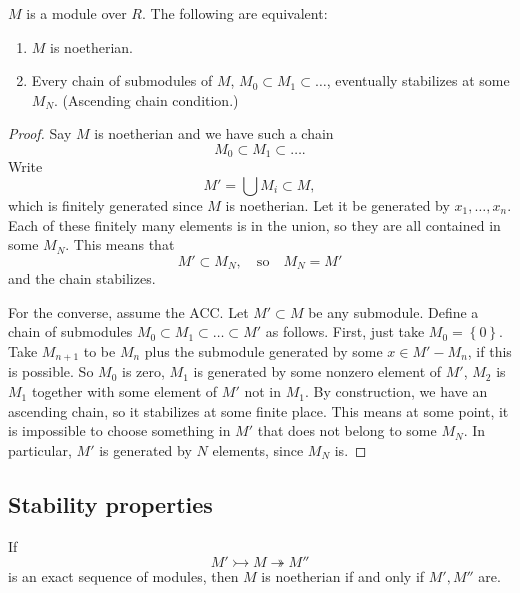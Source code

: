 \begin{proposition} $M$ is a module over $R$.
The following are equivalent:
\begin{enumerate}
\item $M$ is noetherian. 
\item Every chain of submodules of $M$, $M_0 \subset M_1 \subset \dots$,
eventually stabilizes at some $M_N$. (Ascending chain condition.)
\end{enumerate}
\end{proposition} 
\begin{proof} 
Say $M$ is noetherian and we have such a chain
\[ M_0 \subset M_1 \subset \dots.  \]
Write
\[ M' = \bigcup M_i \subset M,  \]
which is finitely generated since $M$ is noetherian. Let it be generated by
$x_1, \dots,x_n$. Each of these finitely many elements is in the union, so
they are all contained in some $M_N$. This means that
\[ M' \subset M_N, \quad \mathrm{so} \quad M_N = M'  \]
and the chain stabilizes.

For the converse, assume the ACC.  Let $M' \subset M$ be any submodule.  Define
a chain of submodules $M_0 \subset M_1 \subset  \dots \subset M'$ as follows. First, just take
$M_0 = \left\{0\right\}$. Take $M_{n+1}$ to be $M_n$ plus the submodule
generated by some $x \in M' - M_n$, if this is possible.  So $M_0$ is zero,
$M_1$ is generated by some nonzero element of $M'$, $M_2$ is $M_1$ together
with some element of $M'$ not in $M_1$. By construction, we have an ascending
chain, so it stabilizes at some finite place.  This means at some point, it is
impossible to choose something in $M'$ that does not belong to some $M_N$. In
particular, $M'$ is generated by $N$ elements, since $M_N$ is. 
\end{proof} 

\subsection{Stability properties}
\begin{proposition} 
If 
\[ M' \rightarrowtail  M \twoheadrightarrow M''  \]
is an exact sequence of modules, then $M$ is noetherian if and only if $M',
M''$ are.
\end{proposition} 


